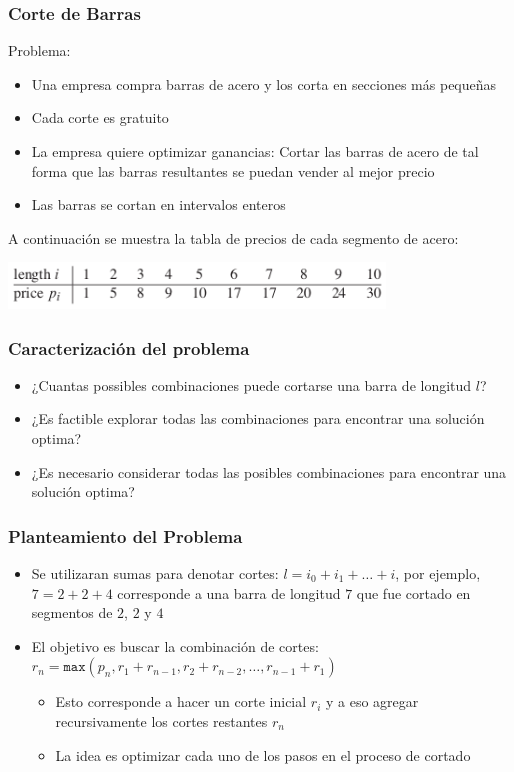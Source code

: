 \documentclass{beamer}
\begin{document}
\begin{frame}
\frametitle{Corte de Barras}
Problema:
\begin{itemize}
    \item{Una empresa compra barras de acero y los corta en secciones
    m\'as peque\~nas}
    \item{Cada corte es gratuito}
    \item{La empresa quiere optimizar ganancias: Cortar las barras de acero
    de tal forma que las barras resultantes se puedan vender al mejor precio}
    \item{Las barras se cortan en intervalos enteros}
\end{itemize}
A continuaci\'on se muestra la tabla de precios de cada segmento de acero:
\begin{center}
    \includegraphics[width=10cm]{precios.png}
\end{center}
\end{frame}

\begin{frame}
\frametitle{Caracterizaci\'on del problema}
\begin{itemize}
    \item{¿Cuantas possibles combinaciones puede cortarse una barra de longitud $l$?}
    \item{¿Es factible explorar todas las combinaciones para encontrar una soluci\'on optima?}
    \item{¿Es necesario considerar todas las posibles combinaciones para encontrar una
    soluci\'on optima?}
\end{itemize}
\end{frame}

\begin{frame}
\frametitle{Planteamiento del Problema}
\begin{itemize}
    \item{Se utilizaran sumas para denotar cortes: $l=i_0 + i_1 + \ldots + i$, por
    ejemplo, $7=2+2+4$ corresponde a una barra de longitud $7$ que fue cortado en
    segmentos de $2$, $2$ y $4$}
    \item{El objetivo es buscar la combinaci\'on de cortes: $r_n=\mathtt{max}(p_n,r_1+r_{n-1},
    r_2+r_{n-2},\ldots,r_{n-1}+r_1)$
    \begin{itemize}
        \item{Esto corresponde a hacer un corte inicial $r_i$ y a eso agregar recursivamente
        los cortes restantes $r_n$}
        \item{La idea es optimizar cada uno de los pasos en el proceso de cortado}
    \end{itemize}
    }
\end{itemize}
\end{frame}
\end{document}
